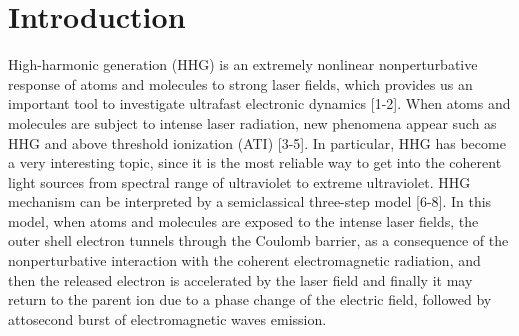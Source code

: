 \documentclass[%
reprint,
twocolumn,
 amsmath,amssymb,
 aps,
pra,
 showpacs
]{revtex4-1}
\begin{document}
\section{Introduction}
High-harmonic generation (HHG) is an extremely nonlinear nonperturbative response of atoms and molecules to strong laser fields, which provides us an important tool to investigate ultrafast electronic dynamics [1-2]. When atoms and molecules are subject to intense laser radiation, new phenomena appear such as HHG and above threshold ionization (ATI) [3-5]. In particular, HHG has become a very interesting topic, since it is the most reliable way to get into the coherent light sources from spectral range of ultraviolet to extreme ultraviolet.
HHG mechanism can be interpreted by a semiclassical three-step model [6-8]. In this model, when atoms and molecules are exposed to the intense laser fields, the outer shell electron  tunnels through the Coulomb barrier, as a consequence of the nonperturbative interaction with the coherent electromagnetic radiation, and then the released electron is accelerated by the laser field and finally it may return to the parent ion due to a phase change of the electric field, followed by attosecond burst of electromagnetic waves emission.
\end{document}
